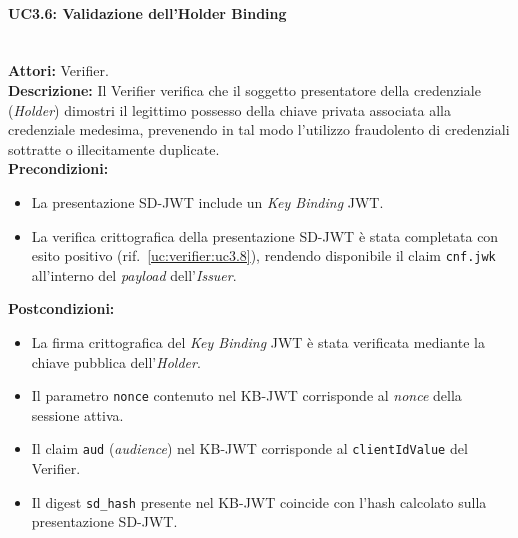 \paragraph{\large\bfseries UC3.6: Validazione dell'Holder Binding}
\label{uc:verifier:uc3.6}
\mbox{}\\
\noindent\textbf{Attori:} Verifier.
\\
\noindent\textbf{Descrizione:} Il Verifier verifica che il soggetto presentatore della credenziale (\textit{Holder}) dimostri il legittimo possesso della chiave privata associata alla credenziale medesima, prevenendo in tal modo l'utilizzo fraudolento di credenziali sottratte o illecitamente duplicate.
\\
\noindent\textbf{Precondizioni:}
\begin{itemize}
    \item La presentazione SD-JWT include un \textit{Key Binding} JWT.
    \item La verifica crittografica della presentazione SD-JWT è stata completata con esito positivo (rif.\ \ref{uc:verifier:uc3.8}), rendendo disponibile il claim \texttt{cnf.jwk} all'interno del \textit{payload} dell'\textit{Issuer}.
\end{itemize}
\noindent\textbf{Postcondizioni:}
\begin{itemize}
    \item La firma crittografica del \textit{Key Binding} JWT è stata verificata mediante la chiave pubblica dell'\textit{Holder}.
    \item Il parametro \texttt{nonce} contenuto nel KB-JWT corrisponde al \textit{nonce} della sessione attiva.
    \item Il claim \texttt{aud} (\textit{audience}) nel KB-JWT corrisponde al \texttt{clientIdValue} del Verifier.
    \item Il digest \texttt{sd\_\allowbreak{}hash} presente nel KB-JWT coincide con l'hash calcolato sulla presentazione SD-JWT.
\end{itemize}

